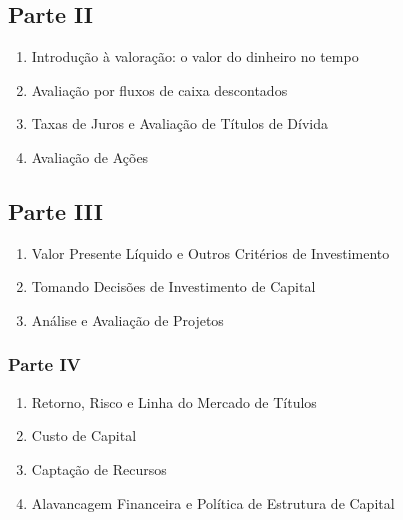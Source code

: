 \documentclass[
]{book}
\providecommand{\tightlist}{%
  \setlength{\itemsep}{0pt}\setlength{\parskip}{0pt}}
\theoremstyle{definition}
\theoremstyle{definition}
\theoremstyle{definition}
\theoremstyle{definition}
\theoremstyle{remark}
\begin{document}
\hypertarget{parte-ii}{%
\subsection{Parte II}\label{parte-ii}}

\begin{enumerate}
\def\labelenumi{\arabic{enumi}.}
\setcounter{enumi}{4}
\tightlist
\item
  Introdução à valoração: o valor do dinheiro no tempo \citep{ross2013fundamentoscp5}\\
\item
  Avaliação por fluxos de caixa descontados \citep{ross2013fundamentoscp6}\\
\item
  Taxas de Juros e Avaliação de Títulos de Dívida \citep{ross2013fundamentoscp7}\\
\item
  Avaliação de Ações \citep{ross2013fundamentoscp8}
\end{enumerate}

\hypertarget{parte-iii}{%
\subsection{Parte III}\label{parte-iii}}

\begin{enumerate}
\def\labelenumi{\arabic{enumi}.}
\setcounter{enumi}{8}
\tightlist
\item
  Valor Presente Líquido e Outros Critérios de Investimento \citep{ross2013fundamentoscp9}\\
\item
  Tomando Decisões de Investimento de Capital \citep{ross2013fundamentoscp10}\\
\item
  Análise e Avaliação de Projetos \citep{ross2013fundamentoscp11}
\end{enumerate}

\hypertarget{parte-iv}{%
\subsubsection{Parte IV}\label{parte-iv}}

\begin{enumerate}
\def\labelenumi{\arabic{enumi}.}
\setcounter{enumi}{11}
\tightlist
\item
  Retorno, Risco e Linha do Mercado de Títulos \citep{ross2013fundamentoscp13}\\
\item
  Custo de Capital \citep{ross2013fundamentoscp14}\\
\item
  Captação de Recursos \citep{ross2013fundamentoscp15}\\
\item
  Alavancagem Financeira e Política de Estrutura de Capital \citep{ross2013fundamentoscp16}
\end{enumerate}
\end{document}
